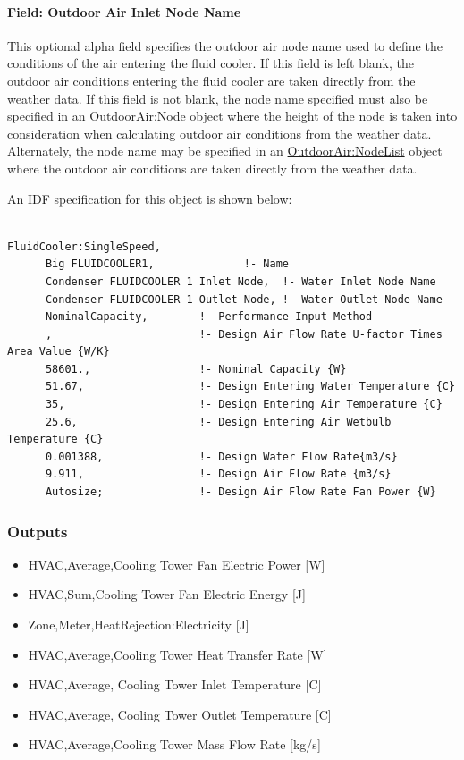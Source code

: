 \paragraph{Field: Outdoor Air Inlet Node Name}\label{field-outdoor-air-inlet-node-name-6}

This optional alpha field specifies the outdoor air node name used to define the conditions of the air entering the fluid cooler. If this field is left blank, the outdoor air conditions entering the fluid cooler are taken directly from the weather data. If this field is not blank, the node name specified must also be specified in an \hyperref[outdoorairnode]{OutdoorAir:Node} object where the height of the node is taken into consideration when calculating outdoor air conditions from the weather data. Alternately, the node name may be specified in an \hyperref[outdoorairnodelist]{\hyperref[outdoorairnode]{OutdoorAir:Node}List} object where the outdoor air conditions are taken directly from the weather data.

An IDF specification for this object is shown below:

\begin{lstlisting}

FluidCooler:SingleSpeed,
      Big FLUIDCOOLER1,              !- Name
      Condenser FLUIDCOOLER 1 Inlet Node,  !- Water Inlet Node Name
      Condenser FLUIDCOOLER 1 Outlet Node, !- Water Outlet Node Name
      NominalCapacity,        !- Performance Input Method
      ,                       !- Design Air Flow Rate U-factor Times Area Value {W/K}
      58601.,                 !- Nominal Capacity {W}
      51.67,                  !- Design Entering Water Temperature {C}
      35,                     !- Design Entering Air Temperature {C}
      25.6,                   !- Design Entering Air Wetbulb Temperature {C}
      0.001388,               !- Design Water Flow Rate{m3/s}
      9.911,                  !- Design Air Flow Rate {m3/s}
      Autosize;               !- Design Air Flow Rate Fan Power {W}
\end{lstlisting}

\subsubsection{Outputs}\label{outputs-8-000}

\begin{itemize}
\item
  HVAC,Average,Cooling Tower Fan Electric Power {[}W{]}
\item
  HVAC,Sum,Cooling Tower Fan Electric Energy {[}J{]}
\item
  Zone,Meter,HeatRejection:Electricity {[}J{]}
\item
  HVAC,Average,Cooling Tower Heat Transfer Rate {[}W{]}
\item
  HVAC,Average, Cooling Tower Inlet Temperature {[}C{]}
\item
  HVAC,Average, Cooling Tower Outlet Temperature {[}C{]}
\item
  HVAC,Average,Cooling Tower Mass Flow Rate {[}kg/s{]}
\end{itemize}

